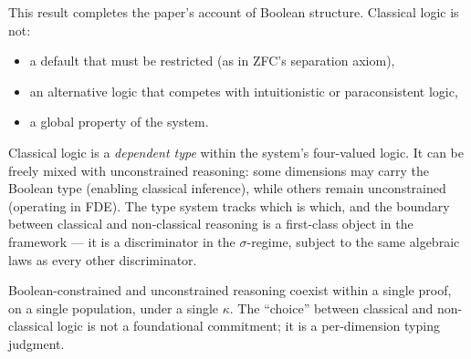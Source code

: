\begin{remark}
This result completes the paper's account of Boolean
structure. Classical logic is not:
\begin{itemize}[nosep]
  \item a default that must be restricted (as in ZFC's
    separation axiom),
  \item an alternative logic that competes with
    intuitionistic or paraconsistent logic,
  \item a global property of the system.
\end{itemize}
Classical logic is a \emph{dependent type} within the
system's four-valued logic. It can be freely mixed with
unconstrained reasoning: some dimensions may carry the
Boolean type (enabling classical inference), while others
remain unconstrained (operating in FDE). The type system
tracks which is which, and the boundary between classical
and non-classical reasoning is a first-class object in the
framework --- it is a discriminator in the $\sigma$-regime,
subject to the same algebraic laws as every other
discriminator.

Boolean-constrained and unconstrained reasoning coexist
within a single proof, on a single population, under a
single $\kappa$. The ``choice'' between classical and
non-classical logic is not a foundational commitment; it
is a per-dimension typing judgment.
\end{remark}

